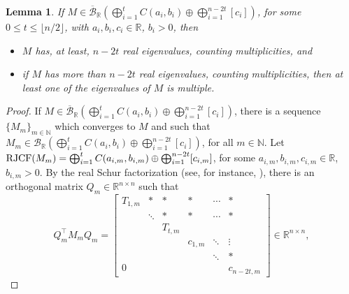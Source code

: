 \documentclass[a4paper]{article}
\newtheorem{lemma}[theorem]{Lemma}
\newcommand{\R}{\mathbb R}
\newcommand{\bunr}{{\mathcal B}_{\R}}
\newcommand{\cbunr}{{\overline{\mathcal B}}_{\R}}
\begin{document}
\begin{lemma}\label{nrealevals.lemma}
 If $M\in\cbunr \left(\bigoplus_{i=1}^tC(a_i,b_i)\oplus\bigoplus_{i=1}^{n-2t}[c_i]\right)$, for some $0\leq t\leq\lfloor n/2\rfloor$, with $a_i, b_i, c_i\in\R$, $ b_i >0$, then
 \begin{itemize}
     \item[\rm (a)]$M$ has, at least, $n-2t$ real eigenvalues, counting multiplicities, and
     \item[\rm(b)] if $M$ has more than $n-2t$ real eigenvalues, counting multiplicities, then at least one of the eigenvalues of $M$ is multiple.
 \end{itemize}
\end{lemma}
\begin{proof}
    If $M\in\cbunr \left(\bigoplus_{i=1}^tC(a_i,b_i)\oplus\bigoplus_{i=1}^{n-2t}[c_i]\right)$, there is a sequence $\{M_m\}_{m\in\mathbb N}$ which converges to $M$ and such that $M_m\in\bunr\left(\bigoplus_{i=1}^tC(a_i,b_i)\oplus\bigoplus_{i=1}^{n-2t}[c_i]\right)$, for all $m\in\mathbb N$. Let %
    ${\rm RJCF}(M_m)=\bigoplus_{i=1}^tC(a_{i,m},b_{i,m})\oplus\bigoplus_{i=1}^{n-2t}[c_{i,m}]$, for some $a_{i,m},b_{i,m},c_{i,m}\in\R$,  $b_{i,m} >0$. By the real Schur factorization (see, for instance, \cite[Th. 2.3.4-(b)]{hj13}), there is an orthogonal matrix $Q_m \in \R^{n\times n}$ such that
    \begin{equation}\label{mk}
Q_m^\top M_mQ_m=\begin{bmatrix}
T_{1,m}&*&*&*&\cdots&*\\&\ddots&*&*&\cdots&*\\&& T_{t,m} \\&&&c_{1,m}&\ddots&\vdots\\&&&&\ddots&*\\0&&&&&c_{n-2t,m}
\end{bmatrix} \in \R^{n \times n},
\end{equation}

\end{proof}
\end{document}

